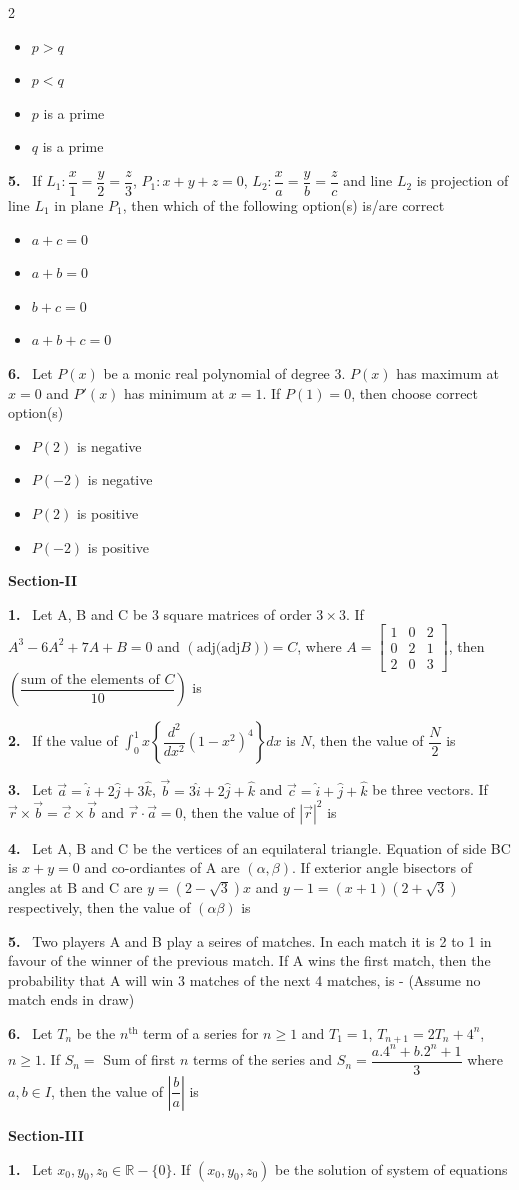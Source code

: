\documentclass[10pt]{extarticle}
\newcommand{\sect}[1]{\par\smallskip\noindent\textbf{#1}\par}
\newcommand{\qn}[1]{\par\smallskip\noindent\textbf{#1.}~}
\newenvironment{qoptions}{\begin{itemize}[leftmargin=1.8em,itemsep=1pt,topsep=2pt,label={}]}{\end{itemize}}
\newcommand{\opt}[2]{\item[(#1)] #2}
\begin{document}
\begin{multicols}{2}
\begin{qoptions}
\opt{A}{$p>q$}
\opt{B}{$p<q$}
\opt{C}{$p$ is a prime}
\opt{D}{$q$ is a prime}
\end{qoptions}
\qn{5} If $L_1:\dfrac x1=\dfrac y2=\dfrac z3$, $P_1:x+y+z=0$, $L_2:\dfrac xa=\dfrac yb=\dfrac zc$ and line $L_2$ is projection of line $L_1$ in plane $P_1$, then which of the following option(s) is/are correct
\begin{qoptions}
\opt{A}{$a+c=0$}
\opt{B}{$a+b=0$}
\opt{C}{$b+c=0$}
\opt{D}{$a+b+c=0$}
\end{qoptions}
\qn{6} Let $P(x)$ be a monic real polynomial of degree 3. $P(x)$ has maximum at $x=0$ and $P'(x)$ has minimum at $x=1$. If $P(1)=0$, then choose correct option(s)
\begin{qoptions}
\opt{A}{$P(2)$ is negative}
\opt{B}{$P(-2)$ is negative}
\opt{C}{$P(2)$ is positive}
\opt{D}{$P(-2)$ is positive}
\end{qoptions}
\sect{Section-II}
\qn{1} Let A, B and C be 3 square matrices of order $3\times3$. If $A^3-6A^2+7A+B=0$ and $(\text{adj(adj}B))=C$, where $A=\begin{bmatrix}1&0&2\\0&2&1\\2&0&3\end{bmatrix}$, then $\left(\dfrac{\text{sum of the elements of }C}{10}\right)$ is
\qn{2} If the value of $\displaystyle\int_0^1x\left\{\dfrac{d^2}{dx^2}\left(1-x^2\right)^4\right\}dx$ is $N$, then the value of $\dfrac N2$ is
\qn{3} Let $\vec a=\hat i+2\hat j+3\hat k$, $\vec b=3\hat i+2\hat j+\hat k$ and $\vec c=\hat i+\hat j+\hat k$ be three vectors. If $\vec r\times\vec b=\vec c\times\vec b$ and $\vec r\cdot\vec a=0$, then the value of $|\vec r|^2$ is
\qn{4} Let A, B and C be the vertices of an equilateral triangle. Equation of side BC is $x+y=0$ and co-ordiantes of A are $(\alpha,\beta)$. If exterior angle bisectors of angles at B and C are $y=\left(2-\sqrt3\right)x$ and $y-1=(x+1)\left(2+\sqrt3\right)$ respectively, then the value of $(\alpha\beta)$ is
\qn{5} Two players A and B play a seires of matches. In each match it is 2 to 1 in favour of the winner of the previous match. If A wins the first match, then the probability that A will win 3 matches of the next 4 matches, is - (Assume no match ends in draw)
\qn{6} Let $T_n$ be the $n^{\text{th}}$ term of a series for $n\ge1$ and $T_1=1$, $T_{n+1}=2T_n+4^n$, $n\ge1$. If $S_n=$ Sum of first $n$ terms of the series and $S_n=\dfrac{a.4^n+b.2^n+1}{3}$ where $a,b\in I$, then the value of $\left|\dfrac ba\right|$ is
\sect{Section-III}
\qn{1} Let $x_0,y_0,z_0\in\mathbb R-\{0\}$. If $(x_0,y_0,z_0)$ be the solution of system of equations\\

\end{multicols}
\end{document}

